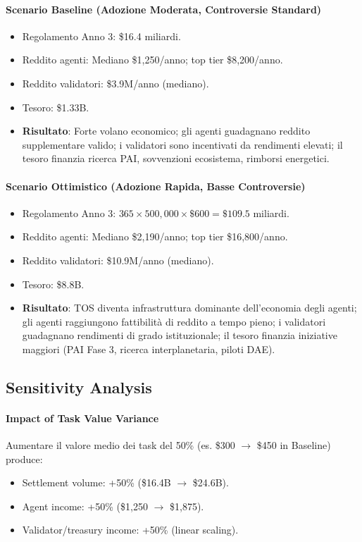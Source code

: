 \documentclass[11pt]{article}
\begin{document}
\begin{itemize}[noitemsep]
\paragraph{Scenario Baseline (Adozione Moderata, Controversie Standard)}
\begin{itemize}[noitemsep]
  \item Regolamento Anno 3: \$16.4 miliardi.
  \item Reddito agenti: Mediano \$1{,}250/anno; top tier \$8{,}200/anno.
  \item Reddito validatori: \$3.9M/anno (mediano).
  \item Tesoro: \$1.33B.
  \item \textbf{Risultato}: Forte volano economico; gli agenti guadagnano reddito supplementare valido; i validatori sono incentivati da rendimenti elevati; il tesoro finanzia ricerca PAI, sovvenzioni ecosistema, rimborsi energetici.
\end{itemize}

\paragraph{Scenario Ottimistico (Adozione Rapida, Basse Controversie)}
\begin{itemize}[noitemsep]
  \item Regolamento Anno 3: $365 \times 500{,}000 \times \$600 = \$109.5$ miliardi.
  \item Reddito agenti: Mediano \$2{,}190/anno; top tier \$16{,}800/anno.
  \item Reddito validatori: \$10.9M/anno (mediano).
  \item Tesoro: \$8.8B.
  \item \textbf{Risultato}: TOS diventa infrastruttura dominante dell'economia degli agenti; gli agenti raggiungono fattibilità di reddito a tempo pieno; i validatori guadagnano rendimenti di grado istituzionale; il tesoro finanzia iniziative maggiori (PAI Fase 3, ricerca interplanetaria, piloti DAE).
\end{itemize}

\subsection{Sensitivity Analysis}
\paragraph{Impact of Task Value Variance}
Aumentare il valore medio dei task del 50\% (es. \$300 $\to$ \$450 in Baseline) produce:
\begin{itemize}[noitemsep]
  \item Settlement volume: +50\% (\$16.4B $\to$ \$24.6B).
  \item Agent income: +50\% (\$1{,}250 $\to$ \$1{,}875).
  \item Validator/treasury income: +50\% (linear scaling).
\end{itemize}


\end{itemize}
\end{document}
